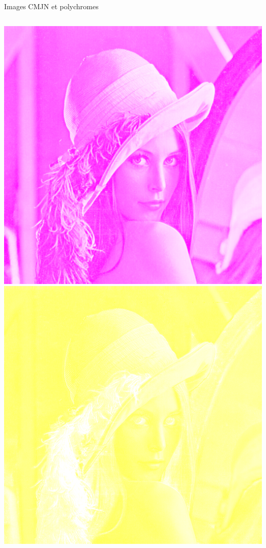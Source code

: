 \begin{frame}{Images CMJN et polychromes}
\begin{columns}
\begin{column}{.15\linewidth}
      \includegraphics[width=\linewidth]{img/06/lena-CMJN-magenta}\\
      \includegraphics[width=\linewidth]{img/06/lena-CMJN-jaune}\\

\end{column}
\end{columns}
\end{frame}
